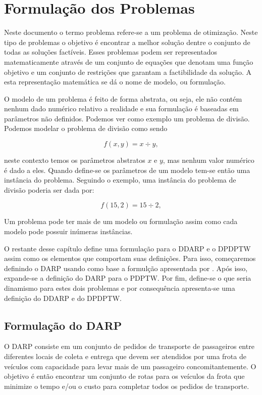 \chapter{Formulação dos Problemas}\label{ch:formulacao_problemas}
Neste documento o termo problema refere-se a um problema de otimização.
Neste tipo de problemas o objetivo é encontrar a melhor solução dentre o
conjunto de todas as soluções factíveis.
Esses problemas podem ser representados matematicamente através de um conjunto
de equações que denotam uma função objetivo e um conjunto de restrições que
garantam a factibilidade da solução.
A esta representação matemática se dá o nome de modelo, ou formulação.

O modelo de um problema é feito de forma abstrata, ou seja, ele não
contém nenhum dado numérico relativo a realidade e sua formulação é baseadas em
parâmetros não definidos.
Podemos ver como exemplo um problema de divisão.
Podemos modelar o problema de divisão como sendo 

\begin{equation}
  f(x, y) = x \div y,
\end{equation}

neste contexto temos os parâmetros abstratos $x$ e $y$, mas nenhum valor 
numérico é dado a eles.
Quando define-se os parâmetros de um modelo tem-se então uma instância do
problema.
Seguindo o exemplo, uma instância do problema de divisão poderia ser dada por:

\begin{equation}
  f(15, 2) = 15 \div 2,
\end{equation}


Um problema pode ter mais de um modelo ou formulação assim como cada modelo
pode possuir inúmeras instâncias.

O restante desse capítulo define uma formulação para o DDARP e o DPDPTW assim 
como os elementos que comportam suas definições. 
Para isso, começaremos definindo o DARP usando como base a formulção 
apresentada por \textcite{cordeau_tabu_2003}. 
Após isso, expande-se a definição do DARP para o PDPTW. 
Por fim, define-se o que seria dinamismo para estes dois problemas e por 
consequência apresenta-se uma definição do DDARP e do DPDPTW.

\section{Formulação do DARP}\label{sec:formulacao_DARP}
O DARP consiste em um conjunto de pedidos de transporte de passageiros entre 
diferentes locais de coleta e entrega que devem ser atendidos por uma frota
de veículos com capacidade para levar mais de um passageiro concomitantemente. 
O objetivo é então encontrar um conjunto de rotas para os veículos da frota
que minimize o tempo e/ou o custo para completar todos os pedidos de
transporte.

